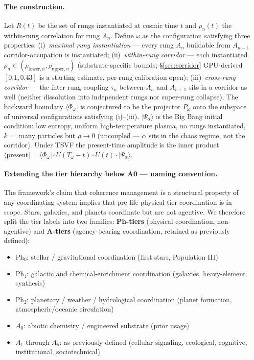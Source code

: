\documentclass[11pt,a4paper]{article}
\newcommand{\Phys}{\mathrm{Ph}}
\begin{document}
\paragraph{The construction.} Let $R(t)$ be the set of rungs instantiated at cosmic time $t$ and $\rho_n(t)$ the within-rung correlation for rung $A_n$. Define $\omega$ as the configuration satisfying three properties: (i)~\emph{maximal rung instantiation} --- every rung $A_n$ buildable from $A_{n-1}$ corridor-occupation is instantiated; (ii)~\emph{within-rung corridor} --- each instantiated $\rho_n \in (\rho_{\text{lower},n}, \rho_{\text{upper},n})$ (substrate-specific bounds; \S\ref{sec:corridor} GPU-derived $[0.1, 0.43]$ is a starting estimate, per-rung calibration open); (iii)~\emph{cross-rung corridor} --- the inter-rung coupling $\tau_n$ between $A_n$ and $A_{n+1}$ sits in a corridor as well (neither dissolution into independent rungs nor super-rung collapse). The backward boundary $\langle\Phi_\omega|$ is conjectured to be the projector $P_\omega$ onto the subspace of universal configurations satisfying (i)--(iii). $|\Psi_\alpha\rangle$ is the Big Bang initial condition: low entropy, uniform high-temperature plasma, no rungs instantiated, $k = $ many particles but $\rho \to 0$ (uncoupled --- $\alpha$ sits in the chaos regime, not the corridor). Under TSVF the present-time amplitude is the inner product $\langle\text{present}| = \langle\Phi_\omega| \cdot U(T_\omega - t) \cdot U(t) \cdot |\Psi_\alpha\rangle$.

\paragraph{Extending the tier hierarchy below A0 — naming convention.} The framework's claim that coherence management is a structural property of any coordinating system implies that pre-life physical-tier coordination is in scope. Stars, galaxies, and planets coordinate but are not agentive. We therefore split the tier labels into two families: \textbf{Ph-tiers} (physical coordination, non-agentive) and \textbf{A-tiers} (agency-bearing coordination, retained as previously defined):

\begin{itemize}[leftmargin=*,itemsep=2pt]
  \item $\Phys_0$: stellar / gravitational coordination (first stars, Population III)
  \item $\Phys_1$: galactic and chemical-enrichment coordination (galaxies, heavy-element synthesis)
  \item $\Phys_2$: planetary / weather / hydrological coordination (planet formation, atmospheric/oceanic circulation)
  \item $A_0$: abiotic chemistry / engineered substrate (prior usage)
  \item $A_1$ through $A_5$: as previously defined (cellular signaling, ecological, cognitive, institutional, sociotechnical)
\end{itemize}
\end{document}
